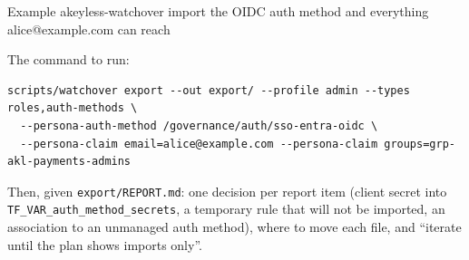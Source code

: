 \begin{session}{Example}
\you akeyless-watchover import the OIDC auth method and everything alice@example.com can reach

\agent The command to run:
\begin{lstlisting}
scripts/watchover export --out export/ --profile admin --types roles,auth-methods \
  --persona-auth-method /governance/auth/sso-entra-oidc \
  --persona-claim email=alice@example.com --persona-claim groups=grp-akl-payments-admins
\end{lstlisting}
Then, given \texttt{export/REPORT.md}: one decision per report item (client secret into
\texttt{TF\_VAR\_auth\_method\_secrets}, a temporary rule that will not be imported, an
association to an unmanaged auth method), where to move each file, and ``iterate until the plan
shows imports only''.
\end{session}
